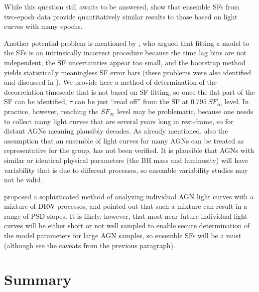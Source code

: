 \documentclass[twocolumn]{aastex6}
\begin{document}
While this question still awaits to be answered, \cite{2008AIPC.1082..282M} show that ensemble SFs from two-epoch data provide quantitatively similar results to those based on light curves with many epochs.

Another potential problem is mentioned by \cite{2010MNRAS.404..931E}, who argued that fitting a model to the SFs is an intrinsically incorrect procedure because the time lag bins are not independent,
the SF uncertainties appear too small, and the bootstrap method yields statistically meaningless SF error bars 
(these problems were also identified and discussed in \citealt{2016ApJ...826..118K}). We provide here a method of determination of the decorrelation timescale 
that is not based on SF fitting, so once the flat part of the SF can be identified, $\tau$ can be just ``read off'' from the SF at $0.795~SF_\infty$ level.
In practice, however, reaching the $SF_\infty$ level may be problematic, because one needs to collect many light curves that are several years long in rest-frame,
so for distant AGNs meaning plausibly decades.
As already mentioned, also the assumption that an ensemble of light curves for many AGNs can be treated as representative for the group,
has not been verified. It is plausible that AGNs with similar or identical physical parameters (the BH mass and luminosity) will have 
variability that is due to different processes, so ensemble variability studies may not be valid.

\cite{2011ApJ...730...52K} proposed a sophisticated method of analyzing individual AGN light curves with a mixture of DRW processes, 
and pointed out that such a mixture can result in a range of PSD slopes.
It is likely, however, that most near-future individual light curves will be either short or not well sampled to enable secure 
determination of the model parameters for large AGN samples, so ensemble SFs will be a must (although see the caveats from the previous paragraph).


\section{Summary}
\label{sec:summary}
\end{document}
